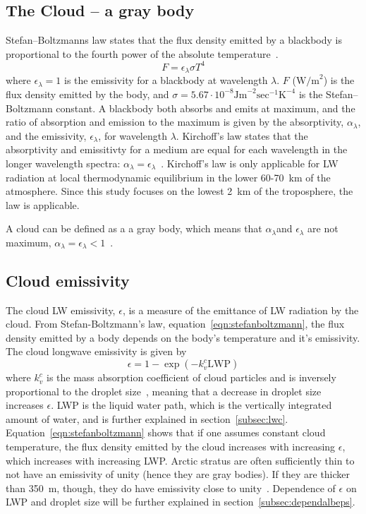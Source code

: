 \subsection{The Cloud -- a gray body}
Stefan–Boltzmanns law states that the flux density emitted by a blackbody is proportional to the fourth power of the absolute temperature~\citep{Liou2002}. 
\begin{equation}
F = \epsilon_{\lambda} \sigma T^4
\label{eqn:stefanboltzmann}
\end{equation}
where $\epsilon_{\lambda} = 1$ is the emissivity for a blackbody at wavelength $\lambda$. $F$ ($\text{W/m}^2$) is the flux density emitted  by the body, and $\sigma = 5.67\cdot 10^{-8} \text{Jm}^{-2}\text{sec}^{-1}\text{K}^{-4}$ is the Stefan–Boltzmann constant. A blackbody both absorbs and emits at maximum, and the ratio of absorption and emission to the maximum is given by the absorptivity, $\alpha_{\lambda}$, and the emissivity, $\epsilon_{\lambda}$, for wavelength $\lambda$. Kirchoff's law states that the absorptivity and emissitivty for a medium are equal for each wavelength in the longer wavelength spectra: $\alpha_{\lambda} = \epsilon_{\lambda}$~\citep{Liou2002}. Kirchoff's law is only applicable for LW radiation at local thermodynamic equilibrium in the lower 60-70~km of the atmosphere. Since this study focuses on the lowest 2~km of the troposphere, the law is applicable.

A cloud can be defined as a a gray body, which means that $\alpha_{\lambda}$and $\epsilon_{\lambda}$ are not maximum, $\alpha_{\lambda}=\epsilon_{\lambda}<1$~\citep{Liou2002}.

\subsection{Cloud emissivity}
The cloud LW emissivity, $\epsilon$, is a measure of the emittance of LW radiation by the cloud. From Stefan-Boltzmann's law, equation~\ref{eqn:stefanboltzmann}, the flux density emitted by a body depends on the body's temperature and it's emissivity. The cloud longwave emissivity is given by~\cite{Liou1992}
\begin{equation}
\epsilon = 1 - \exp(-k_v^c \text{LWP})
\label{eqn:epsilon_lw}
\end{equation}
where $k_v^c$ is the mass absorption coefficient of cloud particles and is inversely proportional to the droplet size~\citep{Alterskjaer2010}, meaning that a decrease in droplet size increases $\epsilon$. LWP is the liquid water path, which is the vertically integrated amount of water, and is further explained in section~\ref{subsec:lwc}. Equation~\ref{eqn:stefanboltzmann} shows that if one assumes constant cloud temperature, the flux density emitted by the cloud increases with increasing $\epsilon$, which increases with increasing LWP. Arctic stratus are often sufficiently thin to not have an emissivity of unity (hence they are gray bodies). If they are thicker than 350~m, though, they do have emissivity close to unity~\citep{Herman1980}. Dependence of $\epsilon$ on LWP and droplet size will be further explained in section~\ref{subsec:dependalbeps}.

